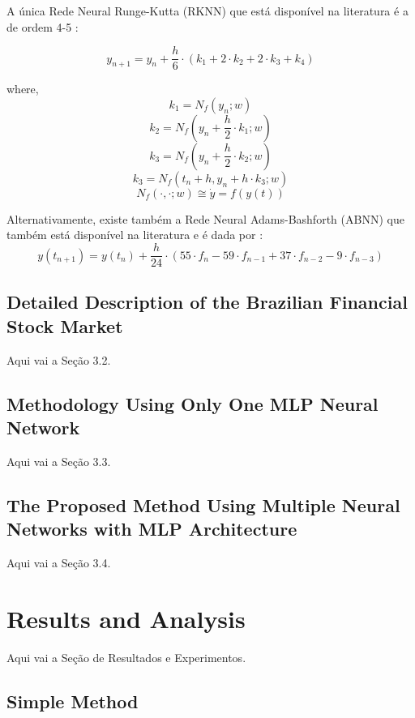 \documentclass[journal,article,submit,pdftex,moreauthors]{Definitions/mdpi}
\begin{document}
A única Rede Neural Runge-Kutta (RKNN) que está disponível na literatura é a de ordem 4-5 \cite{ref11}:

\begin{equation}
	y_{n+1}= y_n + \frac{h}{6}\cdot(k_1+ 2 \cdot k_2 + 2 \cdot k_3 + k_4)
	\label{eq:6}
\end{equation}

\noindent where,
$$ k_1= N_f(y_n;w) $$
$$ k_2= N_f(y_n + \frac{h}{2}\cdot k_1;w) $$
$$ k_3= N_f(y_n + \frac{h}{2}\cdot k_2;w) $$
$$ k_3= N_f(t_n + h, y_n +{h}\cdot k_3;w) $$
$$ N_f( \cdot, \cdot ;w) \cong \dot{y}=f(y(t))$$

Alternativamente, existe também a Rede Neural Adams-Bashforth (ABNN) que também está disponível na literatura e é dada por \cite{ref12}:
\begin{equation}
	y(t_{n+1})=y(t_n)+ \frac{h}{24} \cdot (55 \cdot f_{n} - 59 \cdot f_{n-1} + 37 \cdot f_{n -2} - 9 \cdot f_{n-3})
	\label{eq:7}
\end{equation}

\subsection{Detailed Description of the Brazilian Financial Stock Market}

Aqui vai a Seção 3.2.


\subsection{Methodology Using Only One MLP Neural Network}


Aqui vai a Seção 3.3.



\subsection{The Proposed Method Using Multiple Neural Networks with MLP Architecture}

Aqui vai a Seção 3.4.



\section{Results and Analysis}

Aqui vai a Seção de Resultados e Experimentos.

\subsection{Simple Method}
\end{document}
